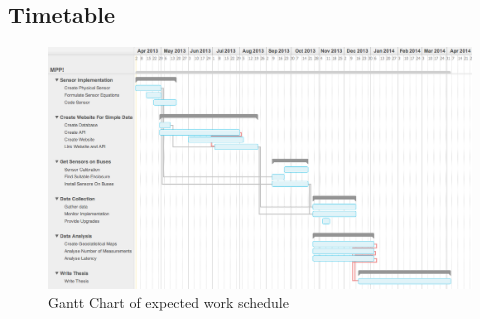 \subsection{Timetable}\label{timetable}

\begin{landscape}
	\begin{figure}[H]
    	\begin{center}
            \includegraphics[scale=0.5]{./images/mpp1/Timetable.png}
            \caption{Gantt Chart of expected work schedule}
            \label{fig:timetable}
    	\end{center}
	\end{figure}
\end{landscape}
